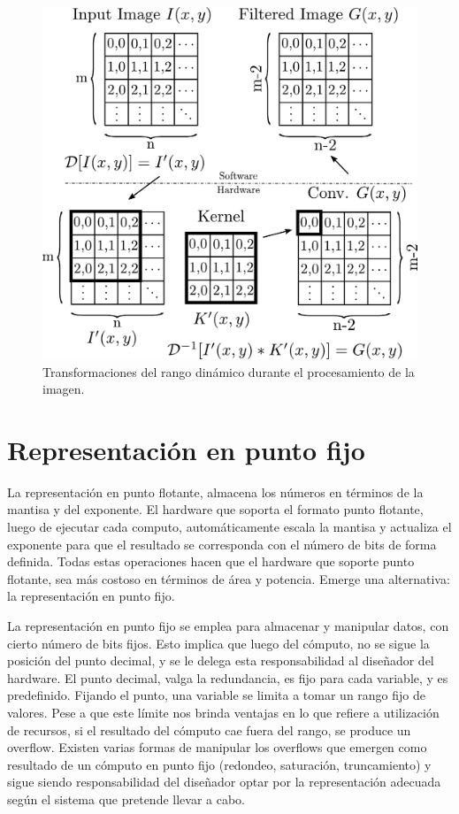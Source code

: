 \begin{figure}
\centering
\includegraphics[scale=0.5]{wflow3}
\caption{Transformaciones del rango dinámico durante el procesamiento de la imagen.}
\label{transformation}
\end{figure}

\section{Representación en punto fijo}\label{fixedpoint}

La representación en punto flotante, almacena los números en términos de la
mantisa y del exponente. El hardware que soporta el formato punto flotante,
luego de ejecutar cada computo, automáticamente escala la mantisa y actualiza el
exponente para que el resultado se corresponda con el número de bits de forma
definida. Todas estas operaciones hacen que el hardware que soporte punto
flotante, sea más costoso en términos de área y potencia. Emerge una
alternativa: la representación en punto fijo.

La representación en punto fijo se emplea para
almacenar y manipular datos, con cierto número de bits fijos. Esto implica que
luego del cómputo, no se sigue la posición del punto decimal, y se le delega
esta responsabilidad al diseñador del hardware. El punto decimal, valga la
redundancia, es fijo para cada variable, y es predefinido. Fijando el punto, una
variable se limita a tomar un rango fijo de valores. Pese a que este límite nos
brinda ventajas en lo que refiere a utilización de recursos, si el resultado del
cómputo cae fuera del rango, se produce un overflow. Existen varias formas de
manipular los overflows que emergen como resultado de un cómputo en punto fijo
(redondeo, saturación, truncamiento) y sigue siendo responsabilidad del
diseñador optar por la representación adecuada según el sistema que pretende
llevar a cabo.

